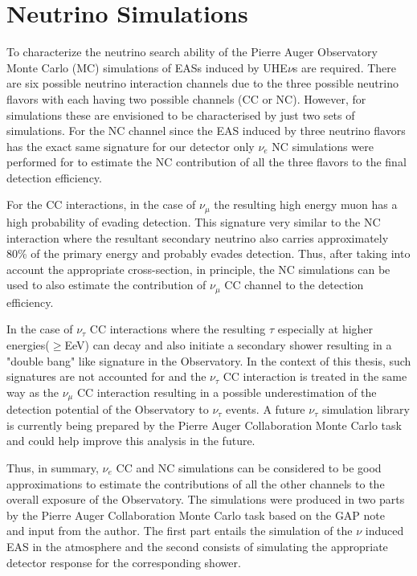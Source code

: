 \section{Neutrino Simulations}
\label{sec:sim_DGL}
To characterize the neutrino search ability of the Pierre Auger Observatory Monte Carlo (MC) simulations of EASs induced by UHE$\nu$s are required. There are six possible neutrino interaction channels due to the three possible neutrino flavors with each having two possible channels (CC or NC). However, for simulations these are envisioned to be characterised by just two sets of simulations. For the NC channel since the EAS induced by three neutrino flavors has the exact same signature for our detector only $\nu_e$ NC simulations were performed for to estimate the NC contribution of all the three flavors to the final detection efficiency. 

For the CC interactions, in the case of $\nu_{\mu}$ the resulting high energy muon has a high probability of evading detection. This signature very similar to the NC interaction where the resultant secondary neutrino also carries approximately 80\% of the primary energy and probably evades detection. Thus, after taking into account the appropriate cross-section, in principle, the NC simulations can be used to also estimate the contribution of $\nu_{\mu}$ CC channel to the detection efficiency.  

In the case of $\nu_{\tau}$ CC interactions where the resulting $\tau$ especially at higher energies($\geq $EeV) can decay and also initiate a secondary shower resulting in a "double bang" like signature in the Observatory. In the context of this thesis, such signatures are not accounted for and the $\nu_{\tau}$ CC interaction is treated in the same way as the $\nu_{\mu}$ CC interaction resulting in a possible underestimation of the detection potential of the Observatory to $\nu_{\tau}$ events. A future $\nu_{\tau}$ simulation library is currently being prepared by the Pierre Auger Collaboration Monte Carlo task and could help improve this analysis in the future.

Thus, in summary, $\nu_e$ CC and NC simulations can be considered to be good approximations to estimate the contributions of all the other channels to the overall exposure of the Observatory. The simulations were produced in two parts by the Pierre Auger Collaboration Monte Carlo task based on the GAP note~\cite{gap_note_2013} and input from the author. The first part entails the simulation of the $\nu$ induced EAS in the atmosphere and the second consists of simulating the appropriate detector response for the corresponding shower. 

